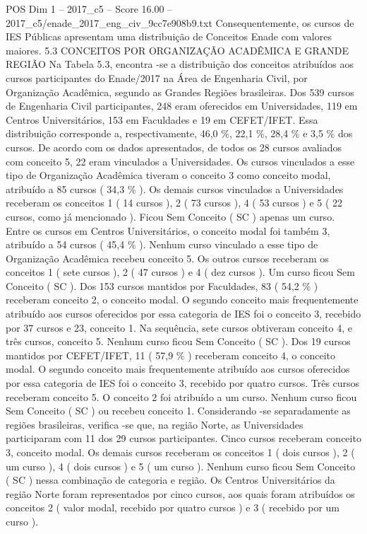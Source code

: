 \begin{textsample}{POS Dim 1 – 2017\_c5 – Score 16.00 – 2017\_c5/enade\_2017\_eng\_civ\_9cc7e908b9.txt}
Consequentemente, os cursos de IES Públicas apresentam uma distribuição de Conceitos Enade com valores maiores. 5.3 CONCEITOS POR ORGANIZAÇÃO ACADÊMICA E GRANDE REGIÃO Na Tabela 5.3, encontra -se a distribuição dos conceitos atribuídos aos cursos participantes do Enade/2017 na Área de Engenharia Civil, por Organização Acadêmica, segundo as Grandes Regiões brasileiras.
Dos 539 cursos de Engenharia Civil participantes, 248 eram oferecidos em Universidades, 119 em Centros Universitários, 153 em Faculdades e 19 em CEFET/IFET.
Essa distribuição corresponde a, respectivamente, 46,0 \%, 22,1 \%, 28,4 \% e 3,5 \% dos cursos.
De acordo com os dados apresentados, de todos os 28 cursos avaliados com conceito 5, 22 eram vinculados a Universidades.
Os cursos vinculados a esse tipo de Organização Acadêmica tiveram o conceito 3 como conceito modal, atribuído a 85 cursos ( 34,3 \% ).
Os demais cursos vinculados a Universidades receberam os conceitos 1 ( 14 cursos ), 2 ( 73 cursos ), 4 ( 53 cursos ) e 5 ( 22 cursos, como já mencionado ).
Ficou Sem Conceito ( SC ) apenas um curso.
Entre os cursos em Centros Universitários, o conceito modal foi também 3, atribuído a 54 cursos ( 45,4 \% ).
Nenhum curso vinculado a esse tipo de Organização Acadêmica recebeu conceito 5.
Os outros cursos receberam os conceitos 1 ( sete cursos ), 2 ( 47 cursos ) e 4 ( dez cursos ).
Um curso ficou Sem Conceito ( SC ).
Dos 153 cursos mantidos por Faculdades, 83 ( 54,2 \% ) receberam conceito 2, o conceito modal.
O segundo conceito mais frequentemente atribuído aos cursos oferecidos por essa categoria de IES foi o conceito 3, recebido por 37 cursos e 23, conceito 1.
Na sequência, sete cursos obtiveram conceito 4, e três cursos, conceito 5.
Nenhum curso ficou Sem Conceito ( SC ).
Dos 19 cursos mantidos por CEFET/IFET, 11 ( 57,9 \% ) receberam conceito 4, o conceito modal.
O segundo conceito mais frequentemente atribuído aos cursos oferecidos por essa categoria de IES foi o conceito 3, recebido por quatro cursos.
Três cursos receberam conceito 5.
O conceito 2 foi atribuído a um curso.
Nenhum curso ficou Sem Conceito ( SC ) ou recebeu conceito 1.
Considerando -se separadamente as regiões brasileiras, verifica -se que, na região Norte, as Universidades participaram com 11 dos 29 cursos participantes.
Cinco cursos receberam conceito 3, conceito modal.
Os demais cursos receberam os conceitos 1 ( dois cursos ), 2 ( um curso ), 4 ( dois cursos ) e 5 ( um curso ).
Nenhum curso ficou Sem Conceito ( SC ) nessa combinação de categoria e região.
Os Centros Universitários da região Norte foram representados por cinco cursos, aos quais foram atribuídos os conceitos 2 ( valor modal, recebido por quatro cursos ) e 3 ( recebido por um curso ).

\end{textsample}
